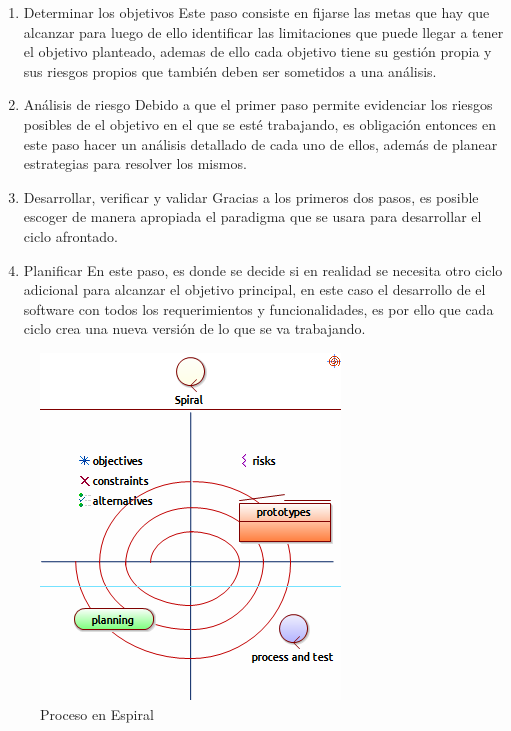 \begin{enumerate}
	\item Determinar los objetivos
	Este paso consiste en fijarse las metas que hay que alcanzar para luego de ello identificar las limitaciones que puede llegar a tener el objetivo planteado, ademas de ello cada objetivo tiene su gestión propia y sus riesgos propios que también deben ser sometidos a una análisis.
	\item Análisis de riesgo
	Debido a que el primer paso permite evidenciar los riesgos posibles de el objetivo en el que se esté trabajando, es obligación entonces en este paso hacer un análisis detallado de cada uno de ellos, además de planear estrategias para resolver los mismos.
	\item Desarrollar, verificar y validar
	Gracias a los primeros dos pasos, es posible escoger de manera apropiada el paradigma que se usara para desarrollar el ciclo afrontado.
	\item Planificar 
	En este paso, es donde se decide si en realidad se necesita otro ciclo adicional para alcanzar el objetivo principal, en este caso el desarrollo de el software con todos los requerimientos y funcionalidades, es por ello que cada ciclo crea una nueva versión de lo que se va trabajando.
\end{enumerate}

\begin{figure}[h!]
	\centering
	\includegraphics[width=0.7\linewidth]{proyecto/imgs/procesoEspiral}
	\caption{Proceso en Espiral}
	\label{fig:procesoespiral}
\end{figure}

